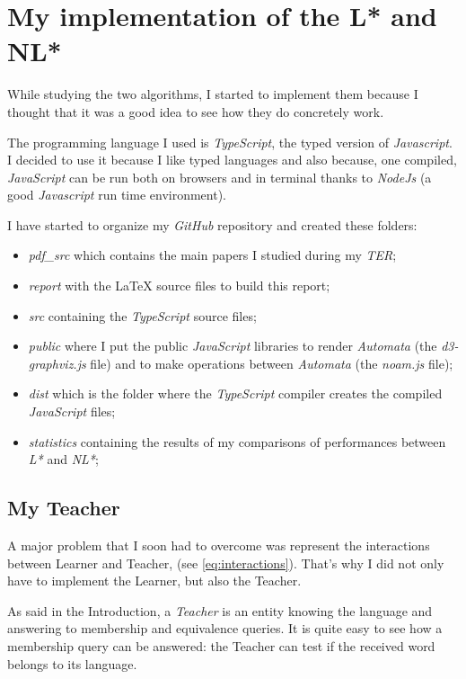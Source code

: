 \section{My implementation of the L* and NL*}
While studying the two algorithms, I started to implement them because I thought that it was a good idea to see how they do concretely work.

The programming language I used is \textit{TypeScript}, the typed version of \textit{Javascript}. I decided to use it because I like typed languages and also because, one compiled, \textit{JavaScript} can be run both on browsers and in terminal thanks to \textit{NodeJs} (a good \textit{Javascript} run time environment).

I have started to organize my \textit{GitHub} repository and created these folders:
\begin{itemize}
  \item \textit{pdf\_src} which contains the main papers I studied during my \textit{TER};
  \item \textit{report} with the \LaTeX{} source files to build this report;
  \item \textit{src} containing the \textit{TypeScript} source files;
  \item \textit{public} where I put the public \textit{JavaScript} libraries to render \textit{Automata} (the \textit{d3-graphviz.js} file) and to make operations between \textit{Automata} (the \textit{noam.js} file);
  \item \textit{dist} which is the folder where the \textit{TypeScript} compiler creates the compiled \textit{JavaScript} files;
  \item \textit{statistics} containing the results of my comparisons of performances between \textit{L*} and \textit{NL*};
\end{itemize}

\subsection{My Teacher}

A major problem that I soon had to overcome was represent the interactions between Learner and Teacher, (see \cref{eq:interactions}). That's why  I did not only have to implement the Learner, but also the Teacher.

As said in the Introduction, a \textit{Teacher} is an entity knowing the language and answering to membership and equivalence queries. It is quite easy to see how a membership query can be answered: the Teacher can test if the received word belongs to its language.

